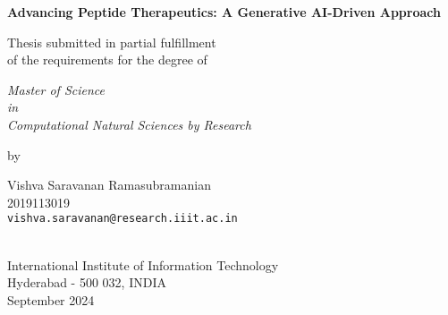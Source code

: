 \thispagestyle{empty}
\begin{center}
\vspace*{1.5cm}
{\Large \bf Advancing Peptide Therapeutics: A Generative AI-Driven Approach}

\vspace*{3.75cm}
{\large Thesis submitted in partial fulfillment\\}
{\large  of the requirements for the degree of \\}

\vspace*{1cm}
{\it {\large Master of Science} \\
{\large in\\}
{\large Computational Natural Sciences by Research \\}}

\vspace*{1cm}
{\large by}

\vspace*{5mm}
{\large Vishva Saravanan Ramasubramanian\\}
{\large 2019113019\\
{\small \tt vishva.saravanan@research.iiit.ac.in}}

\vspace*{4.0cm}
{\\}
{\large International Institute of Information Technology\\}
{\large Hyderabad - 500 032, INDIA\\}
{\large September 2024\\}
\end{center}

